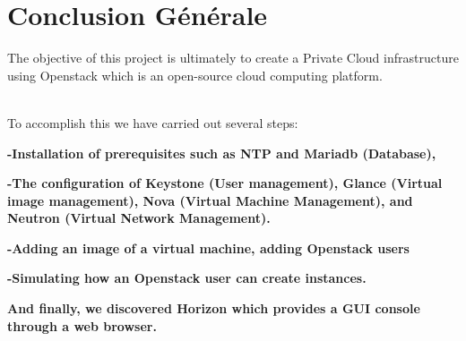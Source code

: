 \chapter*{Conclusion Générale}
\vspace{2cm}
\par \Large The objective of this project is ultimately to create a Private Cloud infrastructure using Openstack which is an open-source cloud computing platform. \\\\
\par \Large To accomplish this we have carried out several steps: 

\begin{flushleft} \large
{
\item \textbf{-Installation of prerequisites such as NTP and Mariadb (Database),} \\[0.7cm]
\item \textbf{-The configuration of Keystone (User management), Glance (Virtual image management), Nova (Virtual Machine Management), and Neutron (Virtual Network Management).}\\[0.7cm]
\item \textbf{-Adding an image of a virtual machine, adding Openstack users }\\[0.7cm]
\item \textbf{-Simulating how an Openstack user can create instances. }\\[0.7cm]
\item \textbf{And finally, we discovered Horizon which provides
a GUI console through a web browser. }\\[0.7cm]
\item
}
\end{flushleft}


\newpage